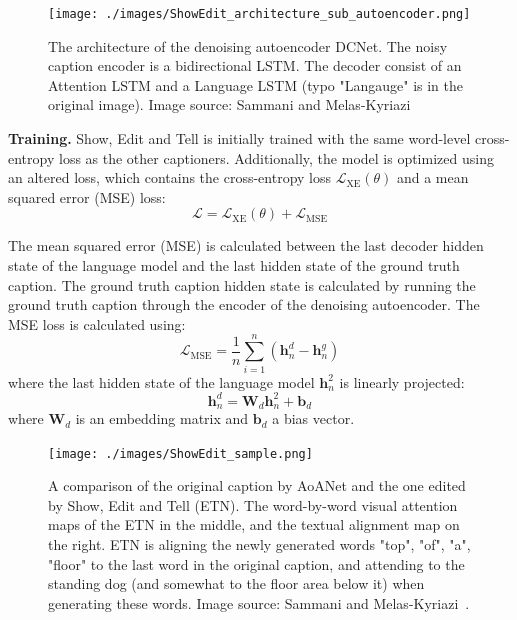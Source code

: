 \documentclass[english,twoside,openright]{HYgraduMLDS}
\newcommand{\matr}[1]{\bm{#1}}
\newcommand{\vect}[1]{\bm{#1}}
\begin{document}
\begin{figure}[H] 
\centering
\texttt{[image: ./images/ShowEdit\_architecture\_sub\_autoencoder.png]}
\caption{The architecture of the denoising autoencoder DCNet. The noisy caption encoder is a bidirectional LSTM. The decoder consist of an Attention LSTM and a Language LSTM (typo "Langauge" is in the original image).  Image source: Sammani and Melas-Kyriazi~\cite{ShowEdit_supp}}
\label{fig:ShowEdit_architecture_sub_autoencoder} 
\end{figure}


\textbf{Training.}
Show, Edit and Tell is initially trained with the same word-level cross-entropy loss as the other captioners. Additionally, the model is optimized using an altered loss, which contains the cross-entropy loss $\mathcal{L}_{\text{XE}}(\theta)$ and a mean squared error (MSE) loss:
\begin{equation}
\mathcal{L} = \mathcal{L}_{\text{XE}}(\theta) + \mathcal{L}_{\text{MSE}}
\end{equation}

The mean squared error (MSE) is calculated between the last decoder hidden state of the language model and the last hidden state of the ground truth caption. The ground truth caption hidden state is calculated by running the ground truth caption through the encoder of the denoising autoencoder. The MSE loss is calculated using:
\begin{equation}
\mathcal{L}_{\text{MSE}} = \frac{1}{n} \sum_{i=1}^n (\vect{h}^d_n - \vect{h}^g_n)
\end{equation}
%
where the last hidden state of the language model $\vect{h}^2_n$ is linearly projected:
\begin{equation}
\vect{h}^d_n = \matr{W}_d \vect{h}^2_n + \vect{b}_d
\end{equation}
%
where $\matr{W}_d$ is an embedding matrix and $\vect{b}_d$ a bias vector.

\begin{figure}[H] 
\centering
\texttt{[image: ./images/ShowEdit\_sample.png]}
\caption{A comparison of the original caption by AoANet and the one edited by Show, Edit and Tell (ETN). The word-by-word visual attention maps of the ETN in the middle, and the textual alignment map on the right. ETN is aligning the newly generated words "top", "of", "a", "floor" to the last word in the original caption, and attending to the standing dog (and somewhat to the floor area below it) when generating these words. Image source: Sammani and Melas-Kyriazi~\cite{ShowEdit}.}
\label{fig:ShowEdit_sample} 
\end{figure}
\end{document}
